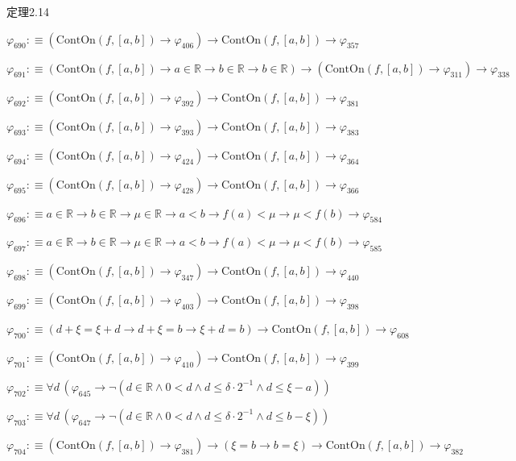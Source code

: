 \begin{fullproof}{定理2.14}
\begin{abbrevlist}
\item $\varphi_{690} :\equiv (\mathrm{ContOn}(f,[a,b]) \to \varphi_{406}) \to \mathrm{ContOn}(f,[a,b]) \to \varphi_{357}$
\item $\varphi_{691} :\equiv (\mathrm{ContOn}(f,[a,b]) \to a \in \mathbb{R} \to b \in \mathbb{R} \to b \in \mathbb{R}) \to (\mathrm{ContOn}(f,[a,b]) \to \varphi_{311}) \to \varphi_{338}$
\item $\varphi_{692} :\equiv (\mathrm{ContOn}(f,[a,b]) \to \varphi_{392}) \to \mathrm{ContOn}(f,[a,b]) \to \varphi_{381}$
\item $\varphi_{693} :\equiv (\mathrm{ContOn}(f,[a,b]) \to \varphi_{393}) \to \mathrm{ContOn}(f,[a,b]) \to \varphi_{383}$
\item $\varphi_{694} :\equiv (\mathrm{ContOn}(f,[a,b]) \to \varphi_{424}) \to \mathrm{ContOn}(f,[a,b]) \to \varphi_{364}$
\item $\varphi_{695} :\equiv (\mathrm{ContOn}(f,[a,b]) \to \varphi_{428}) \to \mathrm{ContOn}(f,[a,b]) \to \varphi_{366}$
\item $\varphi_{696} :\equiv a \in \mathbb{R} \to b \in \mathbb{R} \to \mu \in \mathbb{R} \to a < b \to f(a) < \mu \to \mu < f(b) \to \varphi_{584}$
\item $\varphi_{697} :\equiv a \in \mathbb{R} \to b \in \mathbb{R} \to \mu \in \mathbb{R} \to a < b \to f(a) < \mu \to \mu < f(b) \to \varphi_{585}$
\item $\varphi_{698} :\equiv (\mathrm{ContOn}(f,[a,b]) \to \varphi_{347}) \to \mathrm{ContOn}(f,[a,b]) \to \varphi_{440}$
\item $\varphi_{699} :\equiv (\mathrm{ContOn}(f,[a,b]) \to \varphi_{403}) \to \mathrm{ContOn}(f,[a,b]) \to \varphi_{398}$
\item $\varphi_{700} :\equiv (d + \xi = \xi + d \to d + \xi = b \to \xi + d = b) \to \mathrm{ContOn}(f,[a,b]) \to \varphi_{608}$
\item $\varphi_{701} :\equiv (\mathrm{ContOn}(f,[a,b]) \to \varphi_{410}) \to \mathrm{ContOn}(f,[a,b]) \to \varphi_{399}$
\item $\varphi_{702} :\equiv \forall d\,(\varphi_{645} \to \neg (d \in \mathbb{R} \land 0 < d \land d \leq \delta \cdot 2^{-1} \land d \leq \xi - a))$
\item $\varphi_{703} :\equiv \forall d\,(\varphi_{647} \to \neg (d \in \mathbb{R} \land 0 < d \land d \leq \delta \cdot 2^{-1} \land d \leq b - \xi))$
\item $\varphi_{704} :\equiv (\mathrm{ContOn}(f,[a,b]) \to \varphi_{381}) \to (\xi = b \to b = \xi) \to \mathrm{ContOn}(f,[a,b]) \to \varphi_{382}$

\end{abbrevlist}
\end{fullproof}
